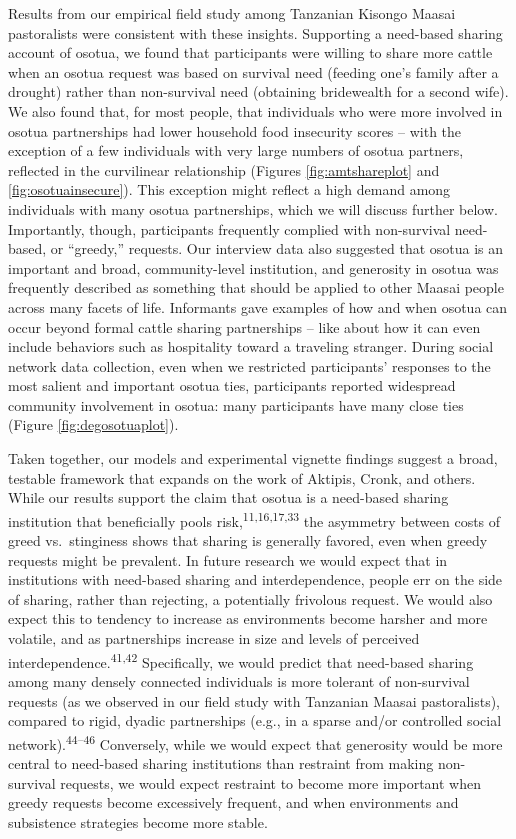 \documentclass[
]{article}
\begin{document}
Results from our empirical field study among Tanzanian Kisongo Maasai pastoralists were consistent with these insights. Supporting a need-based sharing account of osotua, we found that participants were willing to share more cattle when an osotua request was based on survival need (feeding one's family after a drought) rather than non-survival need (obtaining bridewealth for a second wife). We also found that, for most people, that individuals who were more involved in osotua partnerships had lower household food insecurity scores -- with the exception of a few individuals with very large numbers of osotua partners, reflected in the curvilinear relationship (Figures \ref{fig:amtshareplot} and \ref{fig:osotuainsecure}). This exception might reflect a high demand among individuals with many osotua partnerships, which we will discuss further below. Importantly, though, participants frequently complied with non-survival need-based, or ``greedy,'' requests. Our interview data also suggested that osotua is an important and broad, community-level institution, and generosity in osotua was frequently described as something that should be applied to other Maasai people across many facets of life. Informants gave examples of how and when osotua can occur beyond formal cattle sharing partnerships -- like about how it can even include behaviors such as hospitality toward a traveling stranger. During social network data collection, even when we restricted participants' responses to the most salient and important osotua ties, participants reported widespread community involvement in osotua: many participants have many close ties (Figure \ref{fig:degosotuaplot}).

Taken together, our models and experimental vignette findings suggest a broad, testable framework that expands on the work of Aktipis, Cronk, and others. While our results support the claim that osotua is a need-based sharing institution that beneficially pools risk,\textsuperscript{11,16,17,33} the asymmetry between costs of greed vs.~stinginess shows that sharing is generally favored, even when greedy requests might be prevalent. In future research we would expect that in institutions with need-based sharing and interdependence, people err on the side of sharing, rather than rejecting, a potentially frivolous request. We would also expect this to tendency to increase as environments become harsher and more volatile, and as partnerships increase in size and levels of perceived interdependence.\textsuperscript{41,42} Specifically, we would predict that need-based sharing among many densely connected individuals is more tolerant of non-survival requests (as we observed in our field study with Tanzanian Maasai pastoralists), compared to rigid, dyadic partnerships (e.g., in a sparse and/or controlled social network).\textsuperscript{44--46} Conversely, while we would expect that generosity would be more central to need-based sharing institutions than restraint from making non-survival requests, we would expect restraint to become more important when greedy requests become excessively frequent, and when environments and subsistence strategies become more stable.
\end{document}
